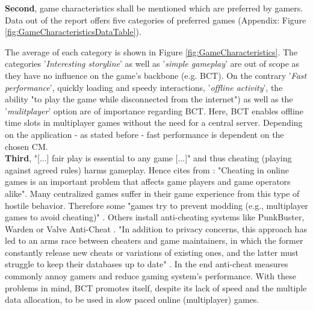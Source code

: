 \textbf{Second}, game characteristics shall be mentioned which are preferred by gamers.
Data out of the report \cite[18]{LimelightNetworks.2020} offers five categories of preferred games (Appendix:
Figure \ref{fig:GameCharacteristicsDataTable}).
\begin{figure}[!b]
\end{figure}
The average of each category is shown in Figure \ref{fig:GameCharacteristics}.
The categories '\textit{Interesting storyline}' as well as '\textit{simple gameplay}' are out of scope as 
they have no influence on the game's backbone (e.g. \gls{BCT}).
On the contrary '\textit{Fast performance}', quickly loading and speedy interactions, '\textit{offline activity}',
the ability "to play the game while disconnected from the internet") \cite[18]{LimelightNetworks.2020}
as well as the '\textit{mulitplayer}' option are of importance regarding \gls{BCT}.
Here, \gls{BCT} enables offline time slots \cite[8]{Nakamoto.2009} in multiplayer games without the need for a central server.
Depending on the application - as stated before - fast performance is dependent on the chosen \gls{CM}. \\
\textbf{Third}, "[...] fair play is essential to any game [...]" \cite[44]{Yan.2009} and thus cheating (playing against agreed rules) harms gameplay.
Hence \cite[2]{HAEBERLEN.2010} cites from \cite{McGraw.2010}: "Cheating in online games is an important problem
that affects game players and game operators alike".
Many centralized games suffer in their game experience from this type of hostile behavior.
Therefore some "games try to prevent modding (e.g., multiplayer games to avoid cheating)" \cite[2493]{Lee.2020}.
Others install anti-cheating systems like PunkBuster, Warden or Valve Anti-Cheat \cite[8]{HAEBERLEN.2010}.
"In addition to privacy concerns, this approach has led to an arms race between cheaters and game maintainers,
in which the former constantly release new cheats or variations of existing ones,
and the latter must struggle to keep their databases up to date" \cite[8]{HAEBERLEN.2010}.
In the end anti-cheat measures commonly annoy gamers and reduce gaming system's performance.
With these problems in mind, \gls{BCT} promotes itself, despite its lack of speed
and the multiple data allocation, to be used in slow paced online (multiplayer) games.



